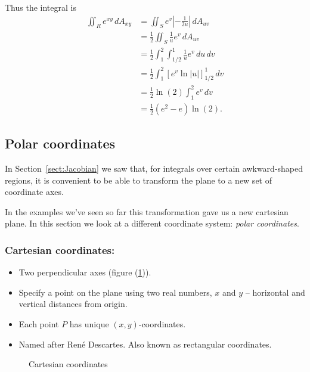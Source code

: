 \begin{example}
     Thus the integral is
       \begin{align*}
         \iint_R e^{xy} \, dA_{xy} & = \iint_S e^v \left|-\frac{1}{2u}\right| \, dA_{uv}  \\
         & = \frac{1}{2} \iint_S \frac{1}{u}e^v \, dA_{uv}  \\
         & = \frac{1}{2} \int_1^2 \int_{1/2}^1 \frac{1}{u}e^v \, du \, dv  \\
         & = \frac{1}{2} \int_1^2 \left[e^v\ln\left|u\right|\right]_{1/2}^1 \, dv  \\
         & = \frac{1}{2}\ln(2)\int_1^2 e^v \, dv  \\
         & = \frac{1}{2}(e^2 - e)\ln(2).
       \end{align*}
  \end{example}



\subsection{Polar coordinates}

  In Section~\ref{sect:Jacobian} we saw that, for integrals over certain awkward-shaped regions, it is convenient to be able to transform the plane to a new set of coordinate axes.

  In the examples we've seen so far this transformation gave us a new cartesian plane.  In this section we look at a different coordinate system: \emph{polar coordinates}.

  \subsubsection*{Cartesian coordinates:}

  \begin{itemize}
    \item Two perpendicular axes (figure (\ref{cartesian})).
    \item Specify a point on the plane using two real numbers, $x$ and $y$ -- horizontal and vertical distances from origin.
    \item Each point $P$ has unique $(x, y)$-coordinates.
    \item Named after Ren\'e Descartes.  Also known as rectangular coordinates.
  \end{itemize}

  \begin{figure}[H]
    \centering
    \def\svgwidth{0.3\columnwidth}
    
    \caption{Cartesian coordinates}
    \label{cartesian}
  \end{figure}


